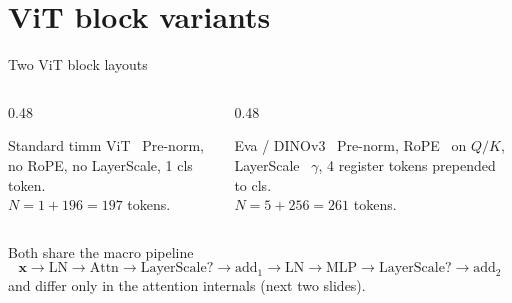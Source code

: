 \documentclass[
  aspectratio=169,
]{beamer}
\begin{document}
\section[Blocks]{ViT block variants}

\begin{frame}{Two ViT block layouts}
\begin{columns}[T]
\begin{column}{0.48\textwidth}
\begin{exampleblock}{Standard timm ViT~\cite{dosovitskiy2021vit}}
Pre-norm, no RoPE, no LayerScale, 1 cls token.\\
$N = 1 + 196 = 197$ tokens.
\end{exampleblock}
\end{column}
\begin{column}{0.48\textwidth}
\begin{exampleblock}{Eva / DINOv3~\cite{darcet2024dinov3}}
Pre-norm, RoPE~\cite{su2021rope} on $Q/K$, LayerScale~\cite{touvron2021cait} $\gamma$, 4 register tokens prepended to cls.\\
$N = 5 + 256 = 261$ tokens.
\end{exampleblock}
\end{column}
\end{columns}

\vspace{4mm}
Both share the macro pipeline
\[
  \mathbf{x} \to \mathrm{LN} \to \mathrm{Attn} \to \mathrm{LayerScale}? \to \mathrm{add}_1 \to \mathrm{LN} \to \mathrm{MLP} \to \mathrm{LayerScale}? \to \mathrm{add}_2
\]
and differ only in the attention internals (next two slides).
\end{frame}
\end{document}
